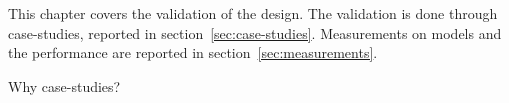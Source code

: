 This chapter covers the validation of the design. The validation is done through case-studies, reported in section~\ref{sec:case-studies}. Measurements on models and the performance are reported in section~\ref{sec:measurements}.

Why case-studies? 

